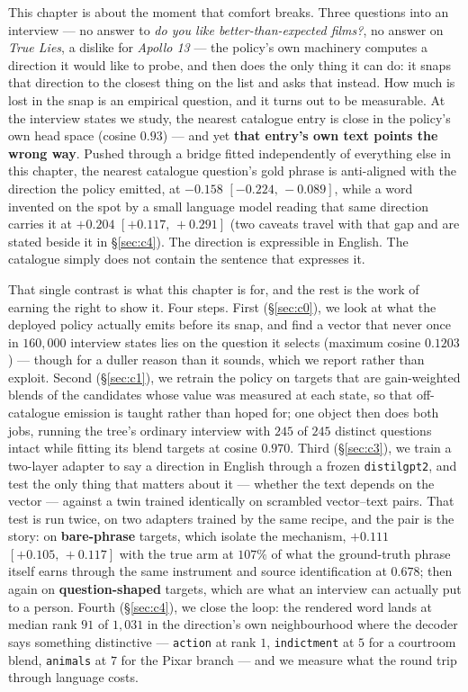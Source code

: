 \documentclass[11pt]{article}
\begin{document}
This chapter is about the moment that comfort breaks. Three questions into an interview --- no answer
to \emph{do you like better-than-expected films?}, no answer on \emph{True Lies}, a dislike for
\emph{Apollo 13} --- the policy's own machinery computes a direction it would like to probe, and then
does the only thing it can do: it snaps that direction to the closest thing on the list and asks that
instead. How much is lost in the snap is an empirical question, and it turns out to be
measurable. At the interview states we study, the nearest catalogue entry is close in the policy's
own head space (cosine $0.93$) --- and yet \textbf{that entry's own text points the wrong way}. Pushed
through a bridge fitted independently of everything else in this chapter, the nearest catalogue
question's gold phrase is anti-aligned with the direction the policy emitted, at $-0.158$
$[-0.224,\,-0.089]$, while a word invented on the spot by a small language model reading that same
direction carries it at $+0.204$ $[+0.117,\,+0.291]$ (two caveats travel with that gap and are
stated beside it in \S\ref{sec:c4}). The direction is expressible in English. The catalogue simply
does not contain the sentence that expresses it.

That single contrast is what this chapter is for, and the rest is the work of earning the right to
show it. Four steps. First (\S\ref{sec:c0}), we look at what the deployed policy actually emits
before its snap, and find a vector that never once in $160{,}000$ interview states lies on the
question it selects (maximum cosine $0.1203$) --- though for a duller reason than it sounds, which we
report rather than exploit. Second (\S\ref{sec:c1}), we retrain the policy on targets that are
gain-weighted blends of the candidates whose value was measured at each state, so that off-catalogue
emission is taught rather than hoped for; one object then does both jobs, running the tree's ordinary
interview with $245$ of $245$ distinct questions intact while fitting its blend targets at cosine
$0.970$. Third (\S\ref{sec:c3}), we train a two-layer adapter to say a direction in English through a
frozen \texttt{distilgpt2}, and test the only thing that matters about it --- whether the text depends
on the vector --- against a twin trained identically on scrambled vector--text pairs. That test is
run twice, on two adapters trained by the same recipe, and the pair is the story: on
\textbf{bare-phrase} targets, which isolate the mechanism, $+0.111$ $[+0.105,\,+0.117]$ with the true
arm at $107\%$ of what the ground-truth phrase itself earns through the same instrument and source
identification at $0.678$; then again on \textbf{question-shaped} targets, which are what an
interview can actually put to a person. Fourth
(\S\ref{sec:c4}), we close the loop: the rendered word lands at median rank $91$ of $1{,}031$ in the
direction's own neighbourhood where the decoder says something distinctive --- \texttt{action} at rank
$1$, \texttt{indictment} at $5$ for a courtroom blend, \texttt{animals} at $7$ for the Pixar branch
--- and we measure what the round trip through language costs.
\end{document}
